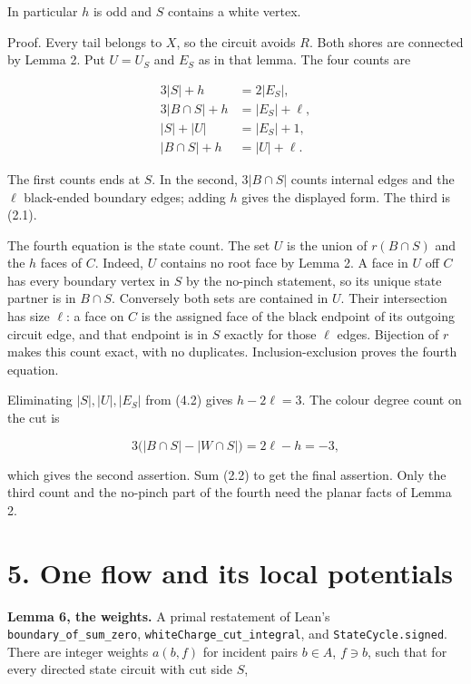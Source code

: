 \documentclass[a4paper,11pt]{amsart}
\begin{document}
In particular $h$ is odd and $S$ contains a white vertex.

Proof. Every tail belongs to $X$, so the circuit avoids $R$. Both shores are connected by Lemma 2. Put $U=U_S$ and $E_S$ as in that lemma. The four counts are

\begin{equation*}
\begin{aligned}
3|S|+h&=2|E_S|,\\
3|B\cap S|+h&=|E_S|+\ell,\\
|S|+|U|&=|E_S|+1,\\
|B\cap S|+h&=|U|+\ell.
\end{aligned}\tag{4.2}
\end{equation*}

The first counts ends at $S$. In the second, $3|B\cap S|$ counts internal edges and the $\ell$ black-ended boundary edges; adding $h$ gives the displayed form. The third is (2.1).

The fourth equation is the state count. The set $U$ is the union of $r(B\cap S)$ and the $h$ faces of $C$. Indeed, $U$ contains no root face by Lemma 2. A face in $U$ off $C$ has every boundary vertex in $S$ by the no-pinch statement, so its unique state partner is in $B\cap S$. Conversely both sets are contained in $U$. Their intersection has size $\ell$: a face on $C$ is the assigned face of the black endpoint of its outgoing circuit edge, and that endpoint is in $S$ exactly for those $\ell$ edges. Bijection of $r$ makes this count exact, with no duplicates. Inclusion-exclusion proves the fourth equation.

Eliminating $|S|,\allowbreak |U|,\allowbreak |E_S|$ from (4.2) gives $h-2\ell=3$. The colour degree count on the cut is

\begin{equation*}
3\bigl(|B\cap S|-|W\cap S|\bigr)=2\ell-h=-3,
\end{equation*}

which gives the second assertion. Sum (2.2) to get the final assertion. Only the third count and the no-pinch part of the fourth need the planar facts of Lemma 2.

\section*{5. One flow and its local potentials}

\textbf{Lemma 6, the weights.} A primal restatement of Lean's \nolinkurl{boundary_of_sum_zero}, \nolinkurl{whiteCharge_cut_integral}, and \nolinkurl{StateCycle.signed}. There are integer weights $a(b,\allowbreak f)$ for incident pairs $b\in A$, $f\ni b$, such that for every directed state circuit with cut side $S$,
\end{document}
